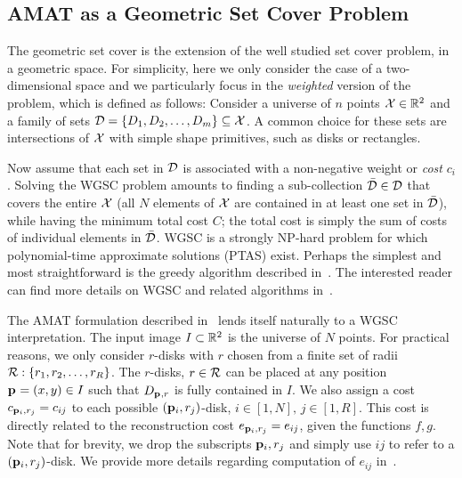 \documentclass[10pt,twocolumn,letterpaper]{article}
\begin{document}
\subsection{AMAT as a Geometric Set Cover Problem}\label{sec:method:wgsc}
The geometric set cover is the extension of the well studied set cover problem, in a geometric space.
For simplicity, here we only consider the case of a two-dimensional space and we particularly focus in the 
\emph{weighted} version of the problem, which is defined as follows:
Consider a universe of $n$ points $\mathcal{X} \in \mathbb{R}^2$ and a family of sets 
$\mathcal{D} = \{D_1,D_2,\ldots,D_m\} \subseteq \mathcal{X}$. 
A common choice for these sets are intersections of $\mathcal{X}$ with simple shape primitives, such as disks or rectangles.

Now assume that each set in $\mathcal{D}$ is associated with a non-negative weight or \emph{cost} $c_i$.
Solving the WGSC problem amounts to finding a sub-collection $\bar{\mathcal{D}} \in \mathcal{D}$ that covers the entire $\mathcal{X}$
(all $N$ elements of $\mathcal{X}$ are contained in at least one set in $\bar{\mathcal{D}}$), while having the minimum
total cost $C$; the total cost is simply the sum of costs of individual elements in $\bar{\mathcal{D}}$.
WGSC is a strongly NP-hard problem for which polynomial-time approximate solutions (PTAS) exist.
Perhaps the simplest and most straightforward is the greedy algorithm described in~\cite{vazirani2013approximation}. 
The interested reader can find more details on WGSC and related algorithms 
in~\cite{mustafa2015quasi,varadarajan2010weighted,har2012weighted,chan2012weighted}.

The AMAT formulation described in~ lends itself naturally to a 
WGSC interpretation.
The input image $I\subset\mathbb{R}^2$ is the universe of $N$ points.
For practical reasons, we only consider $r$-disks with $r$ chosen from a finite set of radii $\mathcal{R}:\{r_1,r_2,\ldots,r_R\}$.
The $r$-disks, $r\in\mathcal{R}$ can be placed at any position $\mathbf{p}_{}=(x,y)\in I$ such that $D_{\mathbf{p}_{},r}$ is fully contained in $I$.
We also assign a cost $c_{\mathbf{p}_{i},r_j} = c_{ij}$ to each possible $(\mathbf{p}_{i},r_j)$-disk, $i\in[1,N],\, j\in[1,R]$.
This cost is directly related to the reconstruction cost 
$e_{\mathbf{p}_{i},r_j} = e_{ij}$, given the functions $f,g$.
Note that for brevity, we drop the subscripts $\mathbf{p}_{i},r_j$ and simply use $ij$ to refer to a $(\mathbf{p}_{i},r_j)$-disk.
We provide more details regarding computation of $e_{ij}$ in~.
\end{document}
